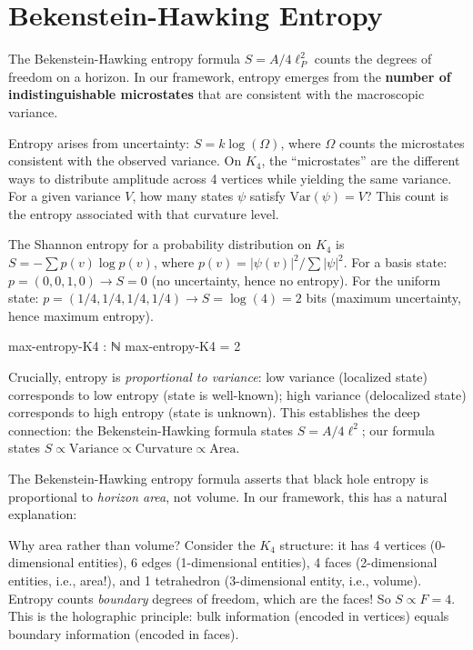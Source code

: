 \documentclass[11pt,a4paper]{book}
\begin{document}
\section{Bekenstein-Hawking Entropy}

The Bekenstein-Hawking entropy formula $S = A/4\ell_P^2$ counts the degrees of freedom on a horizon.
In our framework, entropy emerges from the \textbf{number of indistinguishable
microstates} that are consistent with the macroscopic variance.

Entropy arises from uncertainty: $S = k \log(\Omega)$, where $\Omega$ counts the microstates consistent with the observed variance. On $K_4$, the ``microstates'' are the different ways to distribute amplitude across 4 vertices while yielding the same variance. For a given variance $V$, how many states $\psi$ satisfy $\text{Var}(\psi) = V$? This count is the entropy associated with that curvature level.

The Shannon entropy for a probability distribution on $K_4$ is $S = -\sum p(v) \log p(v)$, where $p(v) = |\psi(v)|^2 / \sum|\psi|^2$. For a basis state: $p = (0,0,1,0) \to S = 0$ (no uncertainty, hence no entropy). For the uniform state: $p = (1/4,1/4,1/4,1/4) \to S = \log(4) = 2$ bits (maximum uncertainty, hence maximum entropy).

\begin{code}
max-entropy-K4 : ℕ
max-entropy-K4 = 2
\end{code}

Crucially, entropy is \emph{proportional to variance}: low variance (localized state) corresponds to low entropy (state is well-known); high variance (delocalized state) corresponds to high entropy (state is unknown). This establishes the deep connection: the Bekenstein-Hawking formula states $S = A/4\ell^2$; our formula states $S \propto \text{Variance} \propto \text{Curvature} \propto \text{Area}$.

The Bekenstein-Hawking entropy formula asserts that black hole entropy is 
proportional to \emph{horizon area}, not volume. In our framework, this has a natural explanation:

Why area rather than volume? Consider the $K_4$ structure: it has 4 vertices (0-dimensional entities), 6 edges (1-dimensional entities), 4 faces (2-dimensional entities, i.e., area!), and 1 tetrahedron (3-dimensional entity, i.e., volume). Entropy counts \emph{boundary} degrees of freedom, which are the faces! So $S \propto F = 4$. This is the holographic principle: bulk information (encoded in vertices) equals boundary information (encoded in faces).
\end{document}
